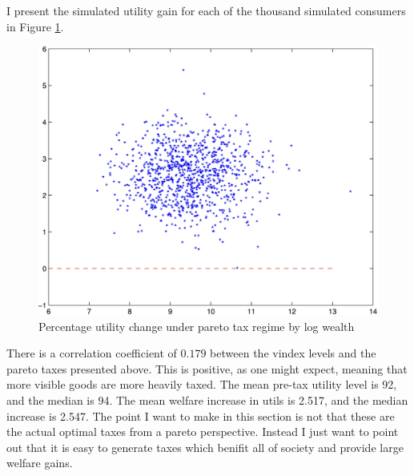 \documentclass[12pt]{article}
\begin{document}
I present the simulated utility gain for each of the thousand simulated consumers in Figure \ref{fig:taxscatter}.
\begin{figure}
    \begin{center}
	\includegraphics[scale=.8]{pics/taxscat_cropped.jpg}
    \end{center}
    \caption{Percentage utility change under pareto tax regime by log wealth}
    \label{fig:taxscatter}
\end{figure}
There is a correlation coefficient of $0.179$ between the vindex levels and the pareto taxes presented above.  This is positive, as one might expect, meaning that more visible goods are more heavily taxed.
The mean pre-tax utility level is 92, and the median is 94.  The mean welfare increase in utils is 2.517, and the median increase is 2.547.  The point I want to make in this section is not that these are the actual optimal taxes from a pareto perspective.  Instead I just want to point out that it is easy to generate taxes which benifit all of society and provide large welfare gains.
\end{document}
